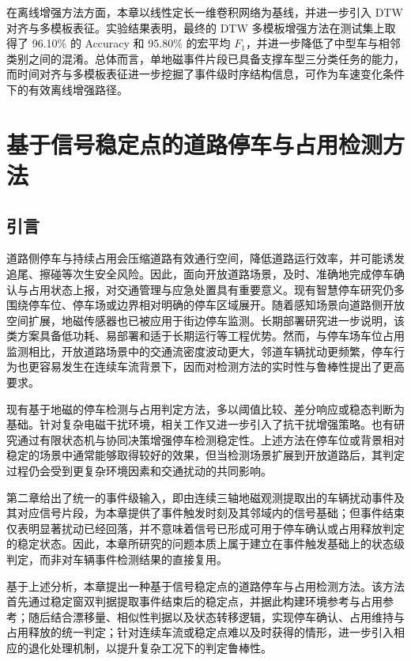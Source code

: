 \documentclass{xdupgthesis}
\begin{document}
在离线增强方法方面，本章以线性定长一维卷积网络为基线，并进一步引入 DTW 对齐与多模板表征。实验结果表明，最终的 DTW 多模板增强方法在测试集上取得了 96.10\% 的 Accuracy 和 95.80\% 的宏平均 $F_1$，并进一步降低了中型车与相邻类别之间的混淆。总体而言，单地磁事件片段已具备支撑车型三分类任务的能力，而时间对齐与多模板表征进一步挖掘了事件级时序结构信息，可作为车速变化条件下的有效离线增强路径。




\chapter{基于信号稳定点的道路停车与占用检测方法}
\label{ch:ch4_parking}

\section{引言}
\label{sec:ch4_intro}

道路侧停车与持续占用会压缩道路有效通行空间，降低道路运行效率，并可能诱发追尾、擦碰等次生安全风险。因此，面向开放道路场景，及时、准确地完成停车确认与占用状态上报，对交通管理与应急处置具有重要意义。现有智慧停车研究仍多围绕停车位、停车场或边界相对明确的停车区域展开\cite{diazogas2020spsurvey}。随着感知场景向道路侧开放空间扩展，地磁传感器也已被应用于街边停车监测\cite{ch4_gu2013streetparking}。长期部署研究进一步说明，该类方案具备低功耗、易部署和适于长期运行等工程优势\cite{ch4_huang2017easydeploy}。然而，与停车场车位占用监测相比，开放道路场景中的交通流密度波动更大，邻道车辆扰动更频繁，停车行为也更容易发生在连续车流背景下，因而对检测方法的实时性与鲁棒性提出了更高要求。

现有基于地磁的停车检测与占用判定方法，多以阈值比较、差分响应或稳态判断为基础\cite{ch4_zhang2015amr}。针对复杂电磁干扰环境，相关工作又进一步引入了抗干扰增强策略\cite{ch4_zhang2020railway}。也有研究通过有限状态机与协同决策增强停车检测稳定性\cite{R47}。上述方法在停车位或背景相对稳定的场景中通常能够取得较好的效果，但当检测场景扩展到开放道路后，其判定过程仍会受到更复杂环境因素和交通扰动的共同影响。

第二章给出了统一的事件级输入，即由连续三轴地磁观测提取出的车辆扰动事件及其对应信号片段，为本章提供了事件触发时刻及其邻域内的信号基础；但事件结束仅表明显著扰动已经回落，并不意味着信号已形成可用于停车确认或占用释放判定的稳定状态。因此，本章所研究的问题本质上属于建立在事件触发基础上的状态级判定，而非对车辆事件检测结果的直接复用。

基于上述分析，本章提出一种基于信号稳定点的道路停车与占用检测方法。该方法首先通过稳定窗双判据提取事件结束后的稳定点，并据此构建环境参考与占用参考；随后结合漂移量、相似性判据以及状态转移逻辑，实现停车确认、占用维持与占用释放的统一判定；针对连续车流或稳定点难以及时获得的情形，进一步引入相应的退化处理机制，以提升复杂工况下的判定鲁棒性。
\end{document}
